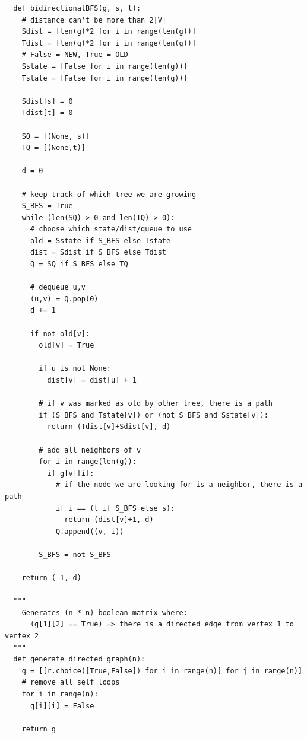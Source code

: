 \documentclass[12pt]{article} \setlength{\oddsidemargin}{0in}
\begin{document}
\begin{enumerate}
\begin{verbatim}
  def bidirectionalBFS(g, s, t):
    # distance can't be more than 2|V|
    Sdist = [len(g)*2 for i in range(len(g))]
    Tdist = [len(g)*2 for i in range(len(g))]
    # False = NEW, True = OLD
    Sstate = [False for i in range(len(g))]
    Tstate = [False for i in range(len(g))]

    Sdist[s] = 0
    Tdist[t] = 0

    SQ = [(None, s)]
    TQ = [(None,t)]

    d = 0
    
    # keep track of which tree we are growing
    S_BFS = True
    while (len(SQ) > 0 and len(TQ) > 0):
      # choose which state/dist/queue to use
      old = Sstate if S_BFS else Tstate
      dist = Sdist if S_BFS else Tdist
      Q = SQ if S_BFS else TQ

      # dequeue u,v   
      (u,v) = Q.pop(0)
      d += 1

      if not old[v]:
        old[v] = True
      
        if u is not None:
          dist[v] = dist[u] + 1
      
        # if v was marked as old by other tree, there is a path
        if (S_BFS and Tstate[v]) or (not S_BFS and Sstate[v]):
          return (Tdist[v]+Sdist[v], d)
        
        # add all neighbors of v
        for i in range(len(g)):
          if g[v][i]:
            # if the node we are looking for is a neighbor, there is a path
            if i == (t if S_BFS else s):
              return (dist[v]+1, d)
            Q.append((v, i))
        
        S_BFS = not S_BFS
    
    return (-1, d)

  """
    Generates (n * n) boolean matrix where:
      (g[1][2] == True) => there is a directed edge from vertex 1 to vertex 2
  """
  def generate_directed_graph(n):
    g = [[r.choice([True,False]) for i in range(n)] for j in range(n)]
    # remove all self loops
    for i in range(n):
      g[i][i] = False

    return g


\end{verbatim}
\end{enumerate}
\end{document}
